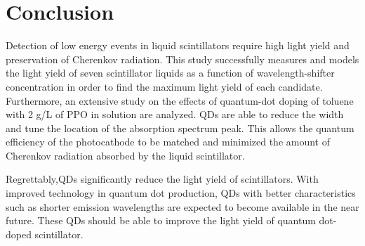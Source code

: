 \documentclass{JINST}
\begin{document}
\section{Conclusion}
Detection of low energy events in liquid scintillators require high light yield and preservation of Cherenkov radiation. This study  successfully measures and models the light yield of seven scintillator liquids as a function of wavelength-shifter concentration in order to find the maximum light yield of each candidate. Furthermore, an extensive study on the effects of quantum-dot doping of toluene with 2 g/L of PPO in solution are analyzed. QDs are able to reduce the width and tune the location of the absorption spectrum peak. This allows the quantum efficiency of the photocathode to be matched and minimized the amount of Cherenkov radiation absorbed by the liquid scintillator.

Regrettably,QDs significantly reduce the light yield of scintillators. With improved technology in quantum dot production, QDs with better characteristics such as shorter emission wavelengths are expected to become available in the near future. These QDs should be able to improve the light yield of quantum dot-doped scintillator. 
\end{document}
